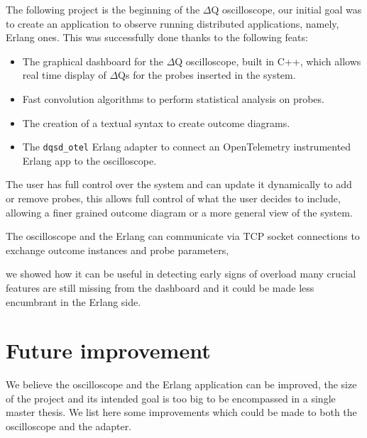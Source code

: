     The following project is the beginning of the $\Delta$Q oscilloscope, our initial goal was to create an application to observe running distributed applications, namely, Erlang ones.
    This was successfully done thanks to the following feats:
    \begin{itemize}
        \item The graphical dashboard for the $\Delta$Q oscilloscope, built in C++, which allows real time display of $\Delta$Qs for the probes inserted in the system.
        \item Fast convolution algorithms to perform statistical analysis on probes.
        \item The creation of a textual syntax to create outcome diagrams.
        \item The \texttt{dqsd\_otel} Erlang adapter to connect an OpenTelemetry instrumented Erlang app to the oscilloscope.
    \end{itemize}
    The user has full control over the system and can update it dynamically to add or remove probes, this allows full control of what the user decides to include, allowing a finer grained outcome diagram or a more general view of the system.  

    The oscilloscope and the Erlang can communicate via TCP socket connections to exchange outcome instances and probe parameters,

    we showed how it can be useful in detecting early signs of overload many crucial features are still missing from the dashboard and it could be made less encumbrant in the Erlang side. 

    \section{Future improvement}
        We believe the oscilloscope and the Erlang application can be improved, the size of the project and its intended goal is too big to be encompassed in a single master thesis. We list here some improvements which could be made to both the oscilloscope and the adapter.
        
